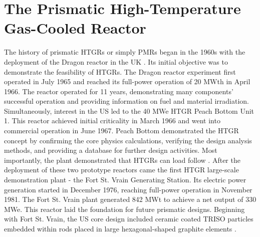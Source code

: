 \section{The Prismatic High-Temperature Gas-Cooled Reactor}
\label{sec:pmr}

The history of prismatic \glspl{HTGR} or simply \glspl{PMR} began in the 1960s with the deployment of the Dragon reactor in the \gls{UK} \cite{brey_development_2001}.
Its initial objective was to demonstrate the feasibility of \glspl{HTGR}.
The Dragon reactor experiment first operated in July 1965 and reached its full-power operation of 20 MWth in April 1966.
The reactor operated for 11 years, demonstrating many components' successful operation and providing information on fuel and material irradiation.
Simultaneously, interest in the \gls{US} led to the 40 MWe \gls{HTGR} Peach Bottom Unit 1.
This reactor achieved initial criticality in March 1966 and went into commercial operation in June 1967.
Peach Bottom demonstrated the \gls{HTGR} concept by confirming the core physics calculations, verifying the design analysis methods, and providing a database for further design activities.
Most importantly, the plant demonstrated that \glspl{HTGR} can load follow \cite{brey_development_2001}.
After the deployment of these two prototype reactors came the first \gls{HTGR} large-scale demonstration plant - the Fort St. Vrain Generating Station.
Its electric power generation started in December 1976, reaching full-power operation in November 1981.
The Fort St. Vrain plant generated 842 MWt to achieve a net output of 330 MWe.
This reactor laid the foundation for future prismatic designs.
Beginning with Fort St. Vrain, the \gls{US} core design included ceramic coated \gls{TRISO} particles embedded within rods placed in large hexagonal-shaped graphite elements \cite{brey_development_2001}.


